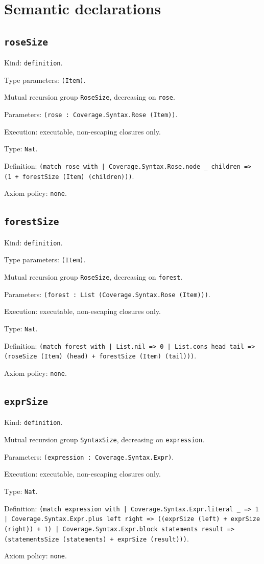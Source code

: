 \documentclass[11pt]{article}
\begin{document}
\section*{Semantic declarations}
\subsection*{\texttt{roseSize}}
\noindent Kind: \texttt{definition}.\par
\noindent Type parameters: \texttt{(Item)}.\par
\noindent Mutual recursion group \texttt{RoseSize}, decreasing on \texttt{rose}.\par
\noindent Parameters: \texttt{(rose : Coverage.Syntax.Rose (Item))}.\par
\noindent Execution: executable, non-escaping closures only.\par
\noindent Type: \texttt{Nat}.\par
\noindent Definition: \texttt{(match rose with | Coverage.Syntax.Rose.node \_ children => (1 + forestSize (Item) (children)))}.\par
\noindent Axiom policy: \texttt{none}.\par
\subsection*{\texttt{forestSize}}
\noindent Kind: \texttt{definition}.\par
\noindent Type parameters: \texttt{(Item)}.\par
\noindent Mutual recursion group \texttt{RoseSize}, decreasing on \texttt{forest}.\par
\noindent Parameters: \texttt{(forest : List (Coverage.Syntax.Rose (Item)))}.\par
\noindent Execution: executable, non-escaping closures only.\par
\noindent Type: \texttt{Nat}.\par
\noindent Definition: \texttt{(match forest with | List.nil => 0 | List.cons head tail => (roseSize (Item) (head) + forestSize (Item) (tail)))}.\par
\noindent Axiom policy: \texttt{none}.\par
\subsection*{\texttt{exprSize}}
\noindent Kind: \texttt{definition}.\par
\noindent Mutual recursion group \texttt{SyntaxSize}, decreasing on \texttt{expression}.\par
\noindent Parameters: \texttt{(expression : Coverage.Syntax.Expr)}.\par
\noindent Execution: executable, non-escaping closures only.\par
\noindent Type: \texttt{Nat}.\par
\noindent Definition: \texttt{(match expression with | Coverage.Syntax.Expr.literal \_ => 1 | Coverage.Syntax.Expr.plus left right => ((exprSize (left) + exprSize (right)) + 1) | Coverage.Syntax.Expr.block statements result => (statementsSize (statements) + exprSize (result)))}.\par
\noindent Axiom policy: \texttt{none}.\par
\end{document}
